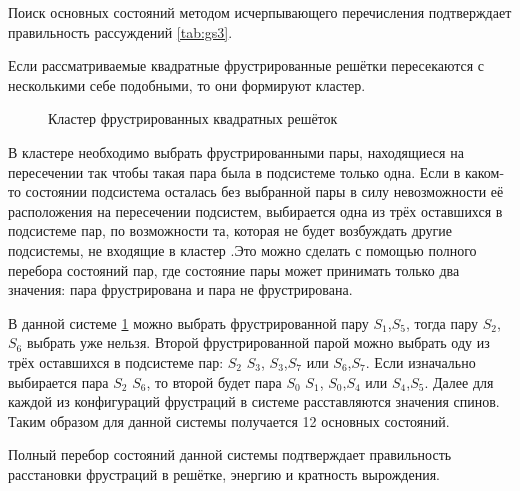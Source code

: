 \documentclass[utf8, babel, sor, jor, amsmath,amssymb, reprint]{elsarticle} %
\begin{document}
Поиск основных состояний методом исчерпывающего перечисления подтверждает правильность рассуждений \eqref{tab:gs3}.

Если рассматриваемые квадратные фрустрированные решётки пересекаются с несколькими себе подобными, то они формируют кластер.

\begin{figure}[h]
	\centering
	\caption{Кластер фрустрированных квадратных решёток}
	\label{fig:cluster}
\end{figure}

В кластере необходимо выбрать фрустрированными пары, находящиеся на пересечении так чтобы такая пара была в подсистеме только одна. Если в каком-то состоянии подсистема осталась без выбранной пары в силу невозможности её расположения на пересечении подсистем, выбирается одна из трёх оставшихся в подсистеме пар, по возможности та, которая не будет возбуждать другие подсистемы, не входящие в кластер .Это можно сделать с помощью полного перебора состояний пар, где состояние пары может принимать только два значения: пара фрустрирована и пара не фрустрирована.

В данной системе \ref{fig:cluster} можно выбрать фрустрированной пару $S_1$,$S_5$, тогда пару  $S_2$,$S_6$ выбрать уже нельзя. Второй фрустрированной парой можно выбрать оду из трёх оставшихся в подсистеме пар: $S_2$ $S_3$, $S_3$,$S_7$ или $S_6$,$S_7$. Если изначально выбирается пара $S_2$ $S_6$, то второй будет пара $S_0$ $S_1$, $S_0$,$S_4$ или $S_4$,$S_5$. Далее для каждой из конфигураций фрустраций в системе расставляются значения спинов. Таким образом для данной системы получается 12 основных состояний.

Полный перебор состояний данной системы подтверждает правильность расстановки фрустраций в решётке, энергию и кратность вырождения.
\end{document}
